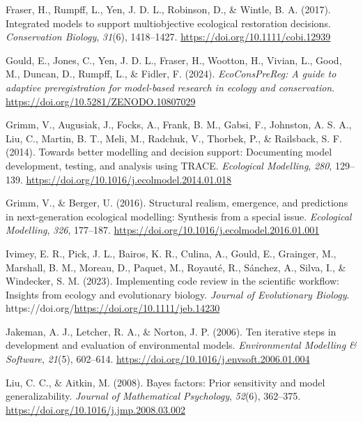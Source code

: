 \documentclass[
]{article}
\newlength{\cslhangindent}
\newenvironment{CSLReferences}[2] %
 {\begin{list}{}{%
  \setlength{\itemindent}{0pt}
  \setlength{\leftmargin}{0pt}
  \setlength{\parsep}{0pt}
  \ifodd #1
   \setlength{\leftmargin}{\cslhangindent}
   \setlength{\itemindent}{-1\cslhangindent}
  \fi
  \setlength{\itemsep}{#2\baselineskip}}}
 {\end{list}}
\begin{document}
\begin{CSLReferences}{1}{0}
Fraser, H., Rumpff, L., Yen, J. D. L., Robinson, D., \& Wintle, B. A.
(2017). Integrated models to support multiobjective ecological
restoration decisions. \emph{Conservation Biology}, \emph{31}(6),
1418--1427. \url{https://doi.org/10.1111/cobi.12939}

Gould, E., Jones, C., Yen, J. D. L., Fraser, H., Wootton, H., Vivian,
L., Good, M., Duncan, D., Rumpff, L., \& Fidler, F. (2024).
\emph{EcoConsPreReg: A guide to adaptive preregistration for model-based
research in ecology and conservation}.
\url{https://doi.org/10.5281/ZENODO.10807029}

Grimm, V., Augusiak, J., Focks, A., Frank, B. M., Gabsi, F., Johnston,
A. S. A., Liu, C., Martin, B. T., Meli, M., Radchuk, V., Thorbek, P., \&
Railsback, S. F. (2014). Towards better modelling and decision support:
Documenting model development, testing, and analysis using TRACE.
\emph{Ecological Modelling}, \emph{280}, 129--139.
\url{https://doi.org/10.1016/j.ecolmodel.2014.01.018}

Grimm, V., \& Berger, U. (2016). Structural realism, emergence, and
predictions in next-generation ecological modelling: Synthesis from a
special issue. \emph{Ecological Modelling}, \emph{326}, 177--187.
\url{https://doi.org/10.1016/j.ecolmodel.2016.01.001}

Ivimey, E. R., Pick, J. L., Bairos, K. R., Culina, A., Gould, E.,
Grainger, M., Marshall, B. M., Moreau, D., Paquet, M., Royauté, R.,
Sánchez, A., Silva, I., \& Windecker, S. M. (2023). Implementing code
review in the scientific workflow: Insights from ecology and
evolutionary biology. \emph{Journal of Evolutionary Biology}.
https://doi.org/\url{https://doi.org/10.1111/jeb.14230}

Jakeman, A. J., Letcher, R. A., \& Norton, J. P. (2006). Ten iterative
steps in development and evaluation of environmental models.
\emph{Environmental Modelling \& Software}, \emph{21}(5), 602--614.
\url{https://doi.org/10.1016/j.envsoft.2006.01.004}

Liu, C. C., \& Aitkin, M. (2008). Bayes factors: Prior sensitivity and
model generalizability. \emph{Journal of Mathematical Psychology},
\emph{52}(6), 362--375. \url{https://doi.org/10.1016/j.jmp.2008.03.002}


\end{CSLReferences}
\end{document}
